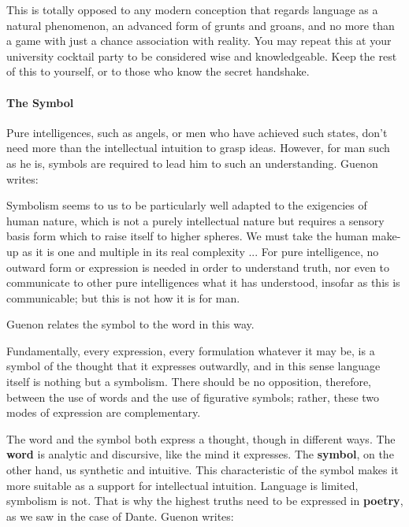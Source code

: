 This is totally opposed to any modern conception that regards language as a natural phenomenon, an advanced form of grunts and groans, and no more than a game with just a chance association with reality. You may repeat this at your university cocktail party to be considered wise and knowledgeable. Keep the rest of this to yourself, or to those who know the secret handshake.

\paragraph{The Symbol}

Pure intelligences, such as angels, or men who have achieved such states, don't need more than the intellectual intuition to grasp ideas. However, for man such as he is, symbols are required to lead him to such an understanding. Guenon writes:

\begin{quotex}
Symbolism seems to us to be particularly well adapted to the exigencies of human nature, which is not a purely intellectual nature but requires a sensory basis form which to raise itself to higher spheres. We must take the human make-up as it is one and multiple in its real complexity
... For pure intelligence, no outward form or expression is needed in order to understand truth, nor even to communicate to other pure intelligences what it has understood, insofar as this is communicable; but this is not how it is for man.
\end{quotex}


Guenon relates the symbol to the word in this way.

\begin{quotex}
Fundamentally, every expression, every formulation whatever it may be, is a symbol of the thought that it expresses outwardly, and in this sense language itself is nothing but a symbolism. There should be no opposition, therefore, between the use of words and the use of figurative symbols; rather, these two modes of expression are complementary.
\end{quotex}


The word and the symbol both express a thought, though in different ways. The \textbf{word} is analytic and discursive, like the mind it expresses. The \textbf{symbol}, on the other hand, us synthetic and intuitive. This characteristic of the symbol makes it more suitable as a support for intellectual intuition. Language is limited, symbolism is not. That is why the highest truths need to be expressed in \textbf{poetry}, as we saw in the case of Dante. Guenon writes:


